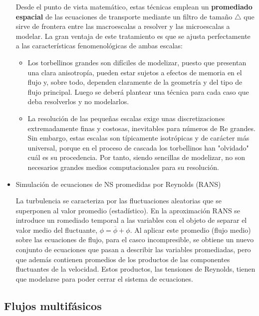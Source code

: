 \begin{itemize}
  Desde el punto de vista matemático, estas técnicas emplean un
  \textbf{promediado espacial} de las ecuaciones de transporte mediante
  un filtro de tamaño \(\triangle\) que sirve de frontera entre las
  macroescalas a resolver y las microescalas a modelar. La gran ventaja
  de este tratamiento es que se ajusta perfectamente a las
  características fenomenológicas de ambas escalas:

  \begin{itemize}
  \item
    Los torbellinos grandes son difíciles de modelizar, puesto que
    presentan una clara anisotropía, pueden estar sujetos a efectos de
    memoria en el flujo y, sobre todo, dependen claramente de la
    geometría y del tipo de flujo principal. Luego se deberá plantear
    una técnica para cada caso que deba resolverlos y no modelarlos.
  \item
    La resolución de las pequeñas escalas exige unas discretizaciones
    extremadamente finas y costosas, inevitables para números de Re
    grandes. Sin embargo, estas escalas son típicamente isotrópicas y de
    carácter más universal, porque en el proceso de cascada los
    torbellinos han "olvidado" cuál es su procedencia. Por tanto, siendo
    sencillas de modelizar, no son necesarios grandes medios
    computacionales para su resolución.
  \end{itemize}
\item
  Simulación de ecuaciones de NS promedidas por Reynolds (RANS)

  La turbulencia se caracteriza por las fluctuaciones aleatorias que se
  superponen al valor promedio (estadístico). En la aproximación RANS se
  introduce un romediado temporal a las variables con el objeto de
  separar el valor medio del fluctuante, \(\phi =\overline{\phi}+\phi\).
  Al aplicar este promedio (flujo medio) sobre las ecuaciones de flujo,
  para el casco incompresible, se obtiene un nuevo conjunto de
  ecuaciones que pasan a describir las variables promediadas, pero que
  además contienen promedios de los productos de las componentes
  fluctuantes de la velocidad. Estos productos, las tensiones de
  Reynolds, tienen que modelarse para poder cerrar el sistema de
  ecuaciones.
\end{itemize}

\subsection{Flujos multifásicos}\label{header-n518}

